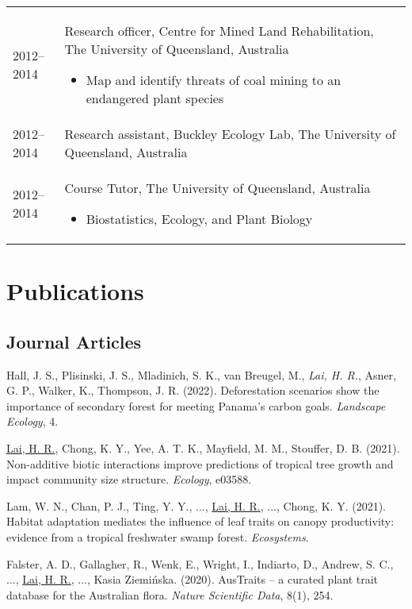 \documentclass[a4paper]{article}
\begin{document}
\begin{tabular}{p{0.13\linewidth} p{0.87\linewidth}}
2012--2014 & Research officer, Centre for Mined Land Rehabilitation, The University of Queensland, Australia
\begin{itemize} 
\item Map and identify threats of coal mining to an endangered plant species
\end{itemize} \\

2012--2014 & Research assistant, Buckley Ecology Lab, The University of Queensland, Australia \\

2012--2014 & Course Tutor, The University of Queensland, Australia
\begin{itemize} 
\item Biostatistics, Ecology, and Plant Biology
\end{itemize} \\

\end{tabular}


\section*{Publications}

\subsection*{Journal Articles}

\hangindent=1cm Hall, J. S., Plisinski, J. S., Mladinich, S. K., van Breugel, M., \textit{Lai, H. R.}, Asner, G. P., Walker, K., Thompson, J. R. (2022). Deforestation scenarios show the importance of secondary forest for meeting Panama’s carbon goals. \textit{Landscape Ecology}, 4.

\hangindent=1cm \underline{Lai, H. R.}, Chong, K. Y., Yee, A. T. K., Mayfield, M. M., Stouffer, D. B. (2021). Non-additive biotic interactions improve predictions of tropical tree growth and impact community size structure. \textit{Ecology}, e03588.

\hangindent=1cm Lam, W. N., Chan, P. J., Ting, Y. Y., ..., \underline{Lai, H. R.}, ..., Chong, K. Y. (2021). Habitat adaptation mediates the influence of leaf traits on canopy productivity: evidence from a tropical freshwater swamp forest. \textit{Ecosystems}.

\hangindent=1cm Falster, A. D., Gallagher, R., Wenk, E., Wright, I., Indiarto, D., Andrew, S. C., ..., \underline{Lai, H. R.}, ..., Kasia Ziemińska. (2020). AusTraits -- a curated plant trait database for the Australian flora. \textit{Nature Scientific Data}, 8(1), 254. 
\end{document}
